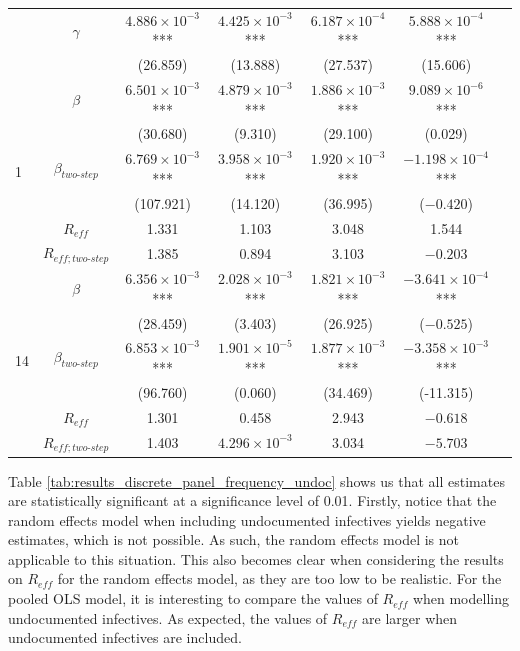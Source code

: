 \documentclass[12pt]{article}
\begin{document}
\begin{appendices}
\begin{longtable}{@{}lcccccc@{}}
    		& $\gamma$ & $4.886 \times 10^{-3}$*** & $4.425 \times 10^{-3}$*** & $6.187 \times 10^{-4}$*** & $5.888 \times 10^{-4}$*** \\ 
             &  & (26.859) & (13.888) & (27.537) & (15.606) \\
    		\midrule
            \multirow{6}{*}{1} & $\beta$ & $6.501 \times 10^{-3}$*** & $4.879 \times 10^{-3}$*** & $1.886 \times 10^{-3}$*** & $9.089 \times 10^{-6}$*** \\  
             &  & (30.680) & (9.310) & (29.100) & (0.029) \\ 
             & $\beta_{two\text{-}step}$ & $6.769 \times 10^{-3}$*** & $3.958 \times 10^{-3}$*** & $1.920 \times 10^{-3}$*** & $-1.198 \times 10^{-4}$*** \\ 
             &  & (107.921) & (14.120) & (36.995) & ($-0.420$) \\
             \cmidrule(lr){2-6}
             & $R_{eff}$ & 1.331 & 1.103 & 3.048 & 1.544 \\
             & $R_{eff;two\text{-}step}$ & 1.385 & 0.894 & 3.103 & $-0.203$ \\
            \midrule
            \multirow{6}{*}{14} & $\beta$ & $6.356 \times 10^{-3}$*** & $2.028 \times 10^{-3}$*** & $1.821 \times 10^{-3}$*** & $-3.641 \times 10^{-4}$*** \\  
             &  & (28.459) & (3.403) & (26.925) & ($-0.525$) \\ 
             & $\beta_{two\text{-}step}$ & $6.853 \times 10^{-3}$*** & $1.901 \times 10^{-5}$*** & $1.877 \times 10^{-3}$*** & $-3.358 \times 10^{-3}$*** \\ 
             &  & (96.760) & (0.060) & (34.469) & (-11.315) \\
             \cmidrule(lr){2-6}
             & $R_{eff}$ & 1.301 & 0.458 & 2.943 & $-0.618$ \\
             & $R_{eff;two\text{-}step}$ & 1.403 & $4.296 \times 10^{-3}$ & 3.034 & $-5.703$ \\* \bottomrule
    	\end{longtable}
    	
    	Table \ref{tab:results_discrete_panel_frequency_undoc} shows us that all estimates are statistically significant at a significance level of 0.01. Firstly, notice that the random effects model when including undocumented infectives yields negative estimates, which is not possible. As such, the random effects model is not applicable to this situation. This also becomes clear when considering the results on $R_{eff}$ for the random effects model, as they are too low to be realistic. For the pooled OLS model, it is interesting to compare the values of $R_{eff}$ when modelling undocumented infectives. As expected, the values of $R_{eff}$ are larger when undocumented infectives are included. \\
    	

\end{appendices}
\end{document}
